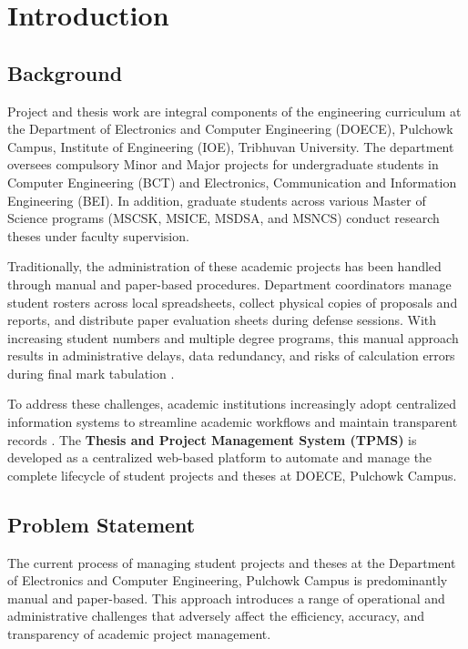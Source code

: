 \chapter{Introduction}

\section{Background}
Project and thesis work are integral components of the engineering curriculum at the Department of Electronics and Computer Engineering (DOECE), Pulchowk Campus, Institute of Engineering (IOE), Tribhuvan University. The department oversees compulsory Minor and Major projects for undergraduate students in Computer Engineering (BCT) and Electronics, Communication and Information Engineering (BEI). In addition, graduate students across various Master of Science programs (MSCSK, MSICE, MSDSA, and MSNCS) conduct research theses under faculty supervision.

Traditionally, the administration of these academic projects has been handled through manual and paper-based procedures. Department coordinators manage student rosters across local spreadsheets, collect physical copies of proposals and reports, and distribute paper evaluation sheets during defense sessions. With increasing student numbers and multiple degree programs, this manual approach results in administrative delays, data redundancy, and risks of calculation errors during final mark tabulation \cite{pressman2015software}.

To address these challenges, academic institutions increasingly adopt centralized information systems to streamline academic workflows and maintain transparent records \cite{ko2021systematic}. The \textbf{Thesis and Project Management System (TPMS)} is developed as a centralized web-based platform to automate and manage the complete lifecycle of student projects and theses at DOECE, Pulchowk Campus.

\section{Problem Statement}
The current process of managing student projects and theses at the Department of Electronics and Computer Engineering, Pulchowk Campus is predominantly manual and paper-based. This approach introduces a range of operational and administrative challenges that adversely affect the efficiency, accuracy, and transparency of academic project management.

